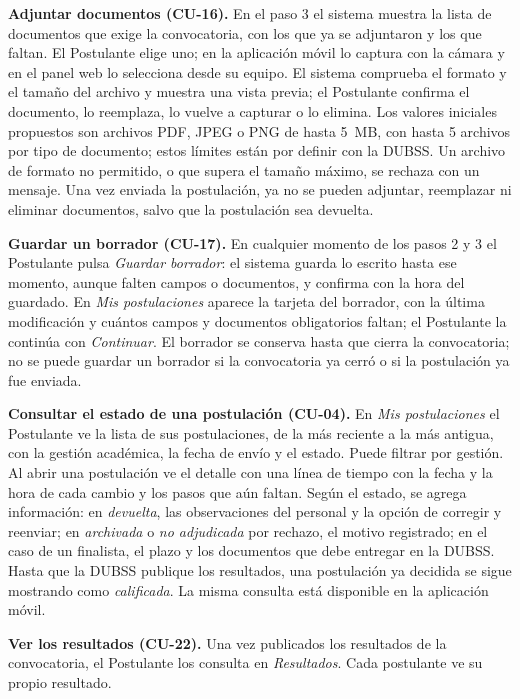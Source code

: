 \textbf{Adjuntar documentos (CU-16).} En el paso 3 el sistema muestra la lista de documentos que exige la convocatoria, con los que ya se adjuntaron y los que faltan. El Postulante elige uno; en la aplicación móvil lo captura con la cámara y en el panel web lo selecciona desde su equipo. El sistema comprueba el formato y el tamaño del archivo y muestra una vista previa; el Postulante confirma el documento, lo reemplaza, lo vuelve a capturar o lo elimina. Los valores iniciales propuestos son archivos PDF, JPEG o PNG de hasta 5~MB, con hasta 5 archivos por tipo de documento; estos límites están por definir con la DUBSS. Un archivo de formato no permitido, o que supera el tamaño máximo, se rechaza con un mensaje. Una vez enviada la postulación, ya no se pueden adjuntar, reemplazar ni eliminar documentos, salvo que la postulación sea devuelta.\par

\textbf{Guardar un borrador (CU-17).} En cualquier momento de los pasos 2 y 3 el Postulante pulsa \textit{Guardar borrador}: el sistema guarda lo escrito hasta ese momento, aunque falten campos o documentos, y confirma con la hora del guardado. En \textit{Mis postulaciones} aparece la tarjeta del borrador, con la última modificación y cuántos campos y documentos obligatorios faltan; el Postulante la continúa con \textit{Continuar}. El borrador se conserva hasta que cierra la convocatoria; no se puede guardar un borrador si la convocatoria ya cerró o si la postulación ya fue enviada.\par

\textbf{Consultar el estado de una postulación (CU-04).} En \textit{Mis postulaciones} el Postulante ve la lista de sus postulaciones, de la más reciente a la más antigua, con la gestión académica, la fecha de envío y el estado. Puede filtrar por gestión. Al abrir una postulación ve el detalle con una línea de tiempo con la fecha y la hora de cada cambio y los pasos que aún faltan. Según el estado, se agrega información: en \textit{devuelta}, las observaciones del personal y la opción de corregir y reenviar; en \textit{archivada} o \textit{no adjudicada} por rechazo, el motivo registrado; en el caso de un finalista, el plazo y los documentos que debe entregar en la DUBSS. Hasta que la DUBSS publique los resultados, una postulación ya decidida se sigue mostrando como \textit{calificada}. La misma consulta está disponible en la aplicación móvil.

\textbf{Ver los resultados (CU-22).} Una vez publicados los resultados de la convocatoria, el Postulante los consulta en \textit{Resultados}. Cada postulante ve su propio resultado.

